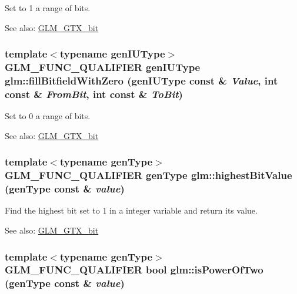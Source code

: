 Set to 1 a range of bits. \begin{Desc}
\item[See also:]\hyperlink{group__gtx__bit}{GLM\_\-GTX\_\-bit} \end{Desc}
\hypertarget{group__gtx__bit_gd7bf903dae07525ab89be5a3cad616a7}{
\subsubsection[fillBitfieldWithZero]{\setlength{\rightskip}{0pt plus 5cm}template$<$typename genIUType$>$ GLM\_\-FUNC\_\-QUALIFIER genIUType glm::fillBitfieldWithZero (genIUType const \& {\em Value}, \/  int const \& {\em FromBit}, \/  int const \& {\em ToBit})}}
\label{group__gtx__bit_gd7bf903dae07525ab89be5a3cad616a7}


Set to 0 a range of bits. \begin{Desc}
\item[See also:]\hyperlink{group__gtx__bit}{GLM\_\-GTX\_\-bit} \end{Desc}
\hypertarget{group__gtx__bit_gda4310fc2dd8db30392da133067ed13e}{
\subsubsection[highestBitValue]{\setlength{\rightskip}{0pt plus 5cm}template$<$typename genType$>$ GLM\_\-FUNC\_\-QUALIFIER genType glm::highestBitValue (genType const \& {\em value})}}
\label{group__gtx__bit_gda4310fc2dd8db30392da133067ed13e}


Find the highest bit set to 1 in a integer variable and return its value. \begin{Desc}
\item[See also:]\hyperlink{group__gtx__bit}{GLM\_\-GTX\_\-bit} \end{Desc}
\hypertarget{group__gtx__bit_g2b12722968dabd423334391d1fd42acd}{
\subsubsection[isPowerOfTwo]{\setlength{\rightskip}{0pt plus 5cm}template$<$typename genType$>$ GLM\_\-FUNC\_\-QUALIFIER bool glm::isPowerOfTwo (genType const \& {\em value})}}
\label{group__gtx__bit_g2b12722968dabd423334391d1fd42acd}


